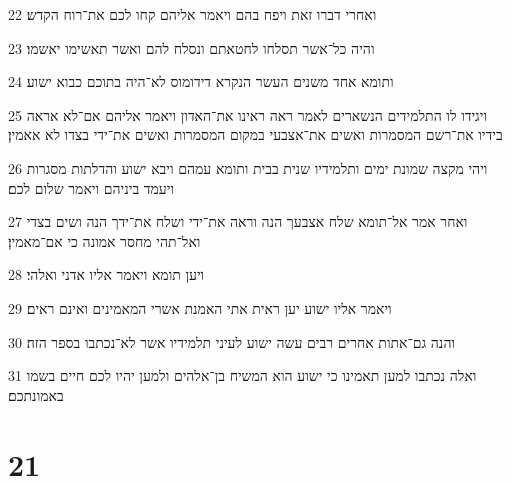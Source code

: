 \par 22 ואחרי דברו זאת ויפח בהם ויאמר אליהם קחו לכם את־רוח הקדש׃
\par 23 והיה כל־אשר תסלחו לחטאתם ונסלח להם ואשר תאשימו יאשמו׃
\par 24 ותומא אחד משנים העשר הנקרא דידומוס לא־היה בתוכם כבוא ישוע׃
\par 25 ויגידו לו התלמידים הנשארים לאמר ראה ראינו את־האדון ויאמר אליהם אם־לא אראה בידיו את־רשם המסמרות ואשים את־אצבעי במקום המסמרות ואשים את־ידי בצדו לא אאמין׃
\par 26 ויהי מקצה שמונת ימים ותלמידיו שנית בבית ותומא עמהם ויבא ישוע והדלתות מסגרות ויעמד ביניהם ויאמר שלום לכם׃
\par 27 ואחר אמר אל־תומא שלח אצבעך הנה וראה את־ידי ושלח את־ידך הנה ושים בצדי ואל־תהי מחסר אמונה כי אם־מאמין׃
\par 28 ויען תומא ויאמר אליו אדני ואלהי׃
\par 29 ויאמר אליו ישוע יען ראית אתי האמנת אשרי המאמינים ואינם ראים׃
\par 30 והנה גם־אתות אחרים רבים עשה ישוע לעיני תלמידיו אשר לא־נכתבו בספר הזה׃
\par 31 ואלה נכתבו למען תאמינו כי ישוע הוא המשיח בן־אלהים ולמען יהיו לכם חיים בשמו באמונתכם׃

\chapter{21}

